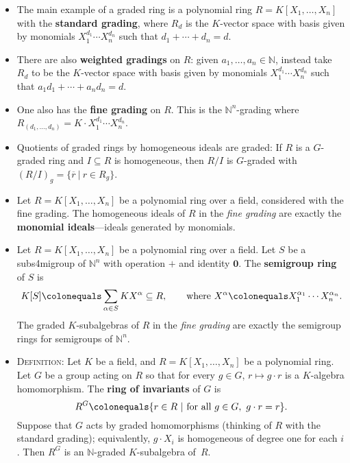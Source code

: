 \documentclass[12pt]{amsart}
\newcommand{\N}{\mathbb{N}}
\newcommand{\0}{$\phantom{.}$}
\newcommand{\1}{\mathbbm{1}}
\newcommand\ceq{\colonequals}
\begin{document}
\begin{itemize}
\item The main example of a graded ring is a polynomial ring $R=K[X_1,\dots,X_n]$ with the \textbf{standard grading}, where $R_d$ is the $K$-vector space with basis given by monomials $X_1^{d_1} \cdots X_n^{d_n}$ such that $d_1+\cdots+d_n=d$. 

\item There are also \textbf{weighted gradings} on $R$: given $a_1,\dots,a_n\in \N$, instead take  $R_d$ to be the $K$-vector space with basis given by monomials $X_1^{d_1} \cdots X_n^{d_n}$ such that $a_1d_1+\cdots+a_n d_n=d$.

\item  One also has the \textbf{fine grading} on $R$. This is the $\N^n$-grading where $R_{(d_1,\dots,d_n)} = K \cdot X_1^{d_1} \cdots X_n^{d_n}$.

\item  Quotients of graded rings by homogeneous ideals are graded: If $R$ is a $G$-graded ring and $I\subseteq R$ is homogeneous, then $R/I$ is $G$-graded with $(R/I)_g = \{ \overline{r} \ | \ r\in R_g\}$.

\item Let $R=K[X_1,\dots,X_n]$ be a polynomial ring over a field, considered with the fine grading.
The homogeneous ideals of $R$ in the  \emph{fine grading} are exactly the \textbf{monomial ideals}---ideals generated by monomials.

\item Let $R=K[X_1,\dots,X_n]$ be a polynomial ring over a field.
Let $S$ be a subs4migroup of $\N^n$ with operation $+$ and identity $\mathbf{0}$. The \textbf{semigroup ring} of $S$ is
\[ K[S] \ceq \sum_{\alpha\in S} K X^\alpha \subseteq R, \qquad \text{where} \ X^\alpha \ceq X_1^{\alpha_1} \cdots X_n^{\alpha_n}.\]
The graded $K$-subalgebras of $R$ in the  \emph{fine grading} are exactly the semigroup rings for semigroups of $\N^n$.

\item \textsc{Definition:} Let $K$ be a field, and $R=K[X_1,\dots,X_n]$ be a polynomial ring. Let $G$ be a group acting on $R$ so that for every $g\in G$,  $r\mapsto g\cdot r$ is a $K$-algebra homomorphism. The \textbf{ring of invariants} of $G$ is
\[ R^G \ceq \{ r\in R \ | \ \text{for all} \ g\in G, \ g\cdot r = r \}.\]
 Suppose that $G$ acts by graded homomorphisms (thinking of $R$ with the standard grading); equivalently, $g\cdot X_i$ is homogeneous of degree one for each $i$. Then $R^G$ is an $\N$-graded $K$-subalgebra of~$R$.
\end{itemize}
\end{document}
